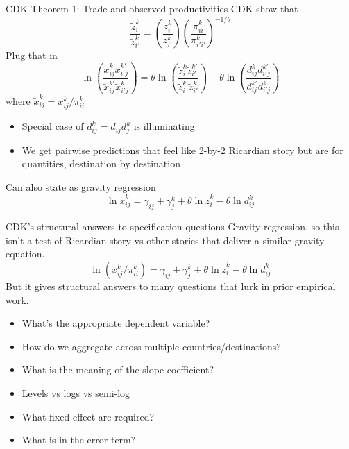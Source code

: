 \documentclass[10pt,notes=hide]{beamer}
\begin{document}
\begin{frame}{CDK Theorem 1: Trade and observed productivities}
CDK show that
\begin{equation*}
\frac{\tilde{z}_i^k}{\tilde{z}_{i'}^k} = \left(\frac{z_i^k}{z_{i'}^k}\right)  \left(\frac{\pi_{ii}^k}{\pi_{i'i'}^k}\right)^{-1/\theta}
\end{equation*}
Plug that in
\begin{equation*}
\ln \left(\frac{\tilde{x}_{ij}^{k}\tilde{x}_{i'j}^{k'}}{\tilde{x}_{ij}^{k'}\tilde{x}_{i'j}^{k}}\right)
=
\theta \ln \left(\frac{\tilde{z}_{i}^{k}\tilde{z}_{i'}^{k'}}{\tilde{z}_{i}^{k'}\tilde{z}_{i'}^{k}}\right)
-
\theta \ln \left(\frac{d_{ij}^{k}d_{i'j}^{k'}}{d_{ij}^{k'}d_{i'j}^{k}}\right)
\end{equation*}
where $\tilde{x}_{ij}^{k} = {x}_{ij}^{k} / \pi_{ii}^k$
\begin{itemize}
	\item Special case of $d_{ij}^{k} = d_{ij} d_j^k$ is illuminating
	\item We get pairwise predictions that feel like 2-by-2 Ricardian story but are for quantities, destination by destination
\end{itemize}
Can also state as gravity regression
\begin{equation*}
\ln \tilde{x}_{ij}^{k} = \gamma_{ij} + \gamma_j^k + \theta \ln \tilde{z}_{i}^{k} - \theta \ln d_{ij}^k
\end{equation*}
\end{frame}
\begin{frame}{CDK's structural answers to specification questions}
Gravity regression, so this isn't a test of Ricardian story vs other stories that deliver a similar gravity equation. 
\begin{equation*}
\ln \left({x}_{ij}^{k}/\pi_{ii}^k \right) = \gamma_{ij} + \gamma_j^k + \theta \ln \tilde{z}_{i}^{k} - \theta \ln d_{ij}^k
\end{equation*}
But it gives structural answers to many questions that lurk in prior empirical work.
\begin{itemize}
	\item What's the appropriate dependent variable?
	\item How do we aggregate across multiple countries/destinations?
	\item What is the meaning of the slope coefficient?
	\item Levels vs logs vs semi-log
	\item What fixed effect are required?
	\item What is in the error term?
\end{itemize}
\end{frame}
\end{document}
